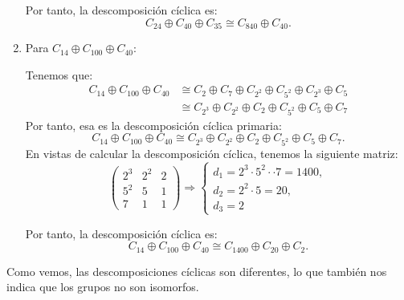 \begin{ejercicio}
\begin{enumerate}
        Por tanto, la descomposición cíclica es:
        \begin{equation*}
            C_{24} \oplus C_{40} \oplus C_{35} \cong C_{840} \oplus C_{40}.
        \end{equation*}

        \item Para $C_{14} \oplus C_{100} \oplus C_{40}$:
        
        Tenemos que:
        \begin{align*}
            C_{14} \oplus C_{100} \oplus C_{40} &\cong C_{2} \oplus C_7 \oplus C_{2^2} \oplus C_{5^2} \oplus C_{2^3} \oplus C_5 \\
            &\cong C_{2^3}\oplus C_{2^2} \oplus C_2 \oplus C_{5^2} \oplus C_5 \oplus C_7
        \end{align*}
        Por tanto, esa es la descomposición cíclica primaria:
        \begin{equation*}
            C_{14} \oplus C_{100} \oplus C_{40} \cong C_{2^3}\oplus C_{2^2} \oplus C_2 \oplus C_{5^2} \oplus C_5 \oplus C_7.
        \end{equation*}
        En vistas de calcular la descomposición cíclica, tenemos la siguiente matriz:
        \begin{equation*}
            \begin{pmatrix}
                2^3 & 2^2 & 2\\
                5^2 & 5 & 1\\
                7 & 1 & 1
            \end{pmatrix}
            \Longrightarrow
            \left\{
                \begin{array}{l}
                    d_1 = 2^3\cdot 5^2\cdot \cdot 7 = 1400, \\
                    d_2 = 2^2\cdot 5 = 20, \\
                    d_3 = 2
                \end{array}
            \right.
        \end{equation*}

        Por tanto, la descomposición cíclica es:
        \begin{equation*}
            C_{14} \oplus C_{100} \oplus C_{40} \cong C_{1400} \oplus C_{20} \oplus C_2.
        \end{equation*}
    \end{enumerate}

    Como vemos, las descomposiciones cíclicas son diferentes, lo que también nos indica que los grupos no son isomorfos.
\end{ejercicio}

